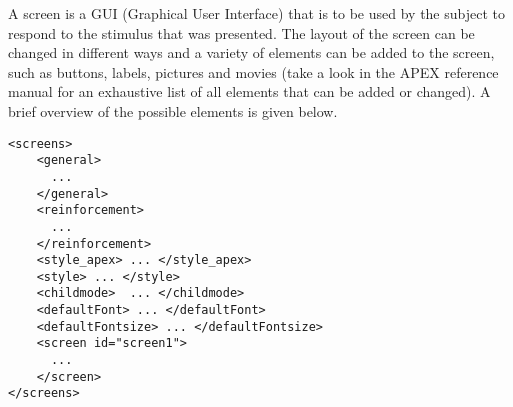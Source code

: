 
\begin{description} \item A screen is a GUI (Graphical User Interface) that is to be used by the subject to
respond to the stimulus that was presented. The layout of the screen can be changed in different ways and a variety of elements can be added to the screen, such as buttons, labels, pictures and movies (take a look in the APEX reference manual for an exhaustive list of all elements that can be added or changed). A brief overview of the possible elements is given below. 
\end{description}

\begin{lstlisting}
<screens>
    <general>
      ...
    </general>
    <reinforcement>
      ...
    </reinforcement>
    <style_apex> ... </style_apex>
    <style> ... </style>
    <childmode>  ... </childmode>
    <defaultFont> ... </defaultFont>
    <defaultFontsize> ... </defaultFontsize>
    <screen id="screen1">
      ...
    </screen>
</screens>
\end{lstlisting}

